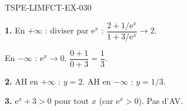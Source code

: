 \begin{corrige}{TSPE-LIMFCT-EX-030}

\textbf{1.} En $+\infty$ : diviser par $\mathrm{e}^x$ : $\dfrac{2+1/\mathrm{e}^x}{1+3/\mathrm{e}^x} \to \boxed{2}$.

En $-\infty$ : $\mathrm{e}^x \to 0$. $\dfrac{0+1}{0+3} = \boxed{\dfrac{1}{3}}$.

\textbf{2.} AH en $+\infty$ : $y = 2$. AH en $-\infty$ : $y = 1/3$.

\textbf{3.} $\mathrm{e}^x + 3 > 0$ pour tout $x$ (car $\mathrm{e}^x > 0$). Pas d'AV.

\end{corrige}

